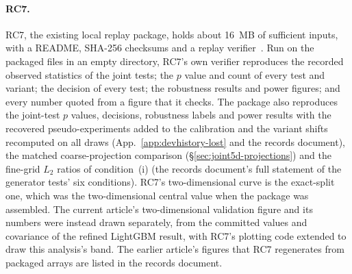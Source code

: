 \paragraph{RC7.} RC7, the existing local replay package, holds about \SI{16}{MB} of sufficient inputs, with a README, SHA-256 checksums and a replay verifier~\cite{ReleaseCandidate2026}. Run on the packaged files in an empty directory, RC7's own verifier reproduces the recorded observed statistics of the joint tests; the $p$ value and count of every test and variant; the decision of every test; the robustness results and power figures; and every number quoted from a figure that it checks. The package also reproduces the joint-test $p$ values, decisions, robustness labels and power results with the recovered pseudo-experiments added to the calibration and the variant shifts recomputed on all draws (App.~\ref{app:devhistory-lost} and the records document), the matched coarse-projection comparison (\S\ref{sec:joint5d-projections}) and the fine-grid $L_2$ ratios of condition~(i) (the records document's full statement of the generator tests' six conditions). RC7's two-dimensional curve is the exact-split one, which was the two-dimensional central value when the package was assembled. The current article's two-dimensional validation figure and its numbers were instead drawn separately, from the committed values and covariance of the refined LightGBM result, with RC7's plotting code extended to draw this analysis's band. The earlier article's figures that RC7 regenerates from packaged arrays are listed in the records document.
